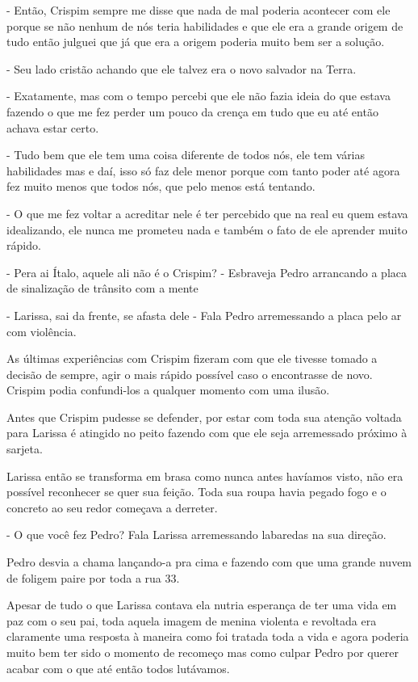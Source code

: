 - Então, Crispim sempre me disse que nada de mal poderia acontecer com ele porque se não nenhum de nós teria habilidades e que ele era a grande origem de tudo então julguei que já que era a origem poderia muito bem ser a solução.

- Seu lado cristão achando que ele talvez era o novo salvador na Terra.

- Exatamente, mas com o tempo percebi que ele não fazia ideia do que estava fazendo o que me fez perder um pouco da crença em tudo que eu até então achava estar certo.

- Tudo bem que ele tem uma coisa diferente de todos nós, ele tem várias habilidades mas e daí, isso só faz dele menor porque com tanto poder até agora fez muito menos que todos nós, que pelo menos está tentando.

- O que me fez voltar a acreditar nele é ter percebido que na real eu quem estava idealizando, ele nunca me prometeu nada e também o fato de ele aprender muito rápido.

- Pera ai Ítalo, aquele ali não é o Crispim? - Esbraveja Pedro arrancando a placa de sinalização de trânsito com a mente

- Larissa, sai da frente, se afasta dele - Fala Pedro arremessando a placa pelo ar com violência.

As últimas experiências com Crispim fizeram com que ele tivesse tomado a decisão de sempre, agir o mais rápido possível caso o encontrasse de novo. Crispim podia confundi-los a qualquer momento com uma ilusão.

Antes que Crispim pudesse se defender, por estar com toda sua atenção voltada para Larissa é atingido no peito fazendo com que ele seja arremessado próximo à sarjeta.

Larissa então se transforma em brasa como nunca antes havíamos visto, não era possível reconhecer se quer sua feição. Toda sua roupa havia pegado fogo e o concreto ao seu redor começava a derreter.

- O que você fez Pedro? Fala Larissa arremessando labaredas na sua direção.

Pedro desvia a chama lançando-a pra cima e fazendo com que uma grande nuvem de foligem paire por toda a rua 33.

Apesar de tudo o que Larissa contava ela nutria esperança de ter uma vida em paz com o seu pai, toda aquela imagem de menina violenta e revoltada era claramente uma resposta à maneira como foi tratada toda a vida e agora poderia muito bem ter sido o momento de recomeço mas como culpar Pedro por querer acabar com o que até então todos lutávamos.

